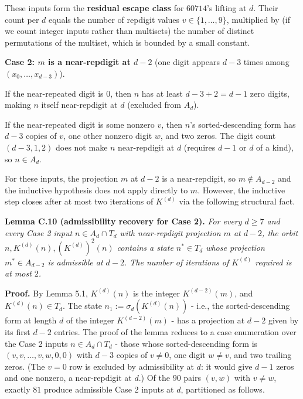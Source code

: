 \documentclass[11pt,letterpaper]{article}
\theoremstyle{paperstyle}
\theoremstyle{paperstyledef}
\theoremstyle{paperstylerem}
\begin{document}
These inputs form the \textbf{residual escape class} for \(60714\)'s
lifting at \(d\). Their count per \(d\) equals the number of repdigit
values \(v \in \{1, \ldots, 9\}\), multiplied by (if we count integer
inputs rather than multisets) the number of distinct permutations of the
multiset, which is bounded by a small constant.

\textbf{Case 2: \(m\) is a near-repdigit at \(d - 2\)} (one digit
appears \(d - 3\) times among \((x_0, \ldots, x_{d-3})\)).

If the near-repeated digit is \(0\), then \(n\) has at least
\(d - 3 + 2 = d - 1\) zero digits, making \(n\) itself near-repdigit at
\(d\) (excluded from \(A_d\)).

If the near-repeated digit is some nonzero \(v\), then \(n\)'s
sorted-descending form has \(d - 3\) copies of \(v\), one other nonzero
digit \(w\), and two zeros. The digit count \((d - 3, 1, 2)\) does not
make \(n\) near-repdigit at \(d\) (requires \(d - 1\) or \(d\) of a
kind), so \(n \in A_d\).

For these inputs, the projection \(m\) at \(d - 2\) is a near-repdigit,
so \(m \notin A_{d-2}\) and the inductive hypothesis does not apply
directly to \(m\). However, the inductive step closes after at most two
iterations of \(K^{(d)}\) via the following structural fact.

\textbf{Lemma C.10 (admissibility recovery for Case 2).} \emph{For every
\(d \geq 7\) and every Case 2 input \(n \in A_d \cap T_d\) with
near-repdigit projection \(m\) at \(d - 2\), the orbit
\(n, K^{(d)}(n), (K^{(d)})^2(n)\) contains a state \(n^* \in T_d\) whose
projection \(m^* \in A_{d-2}\) is admissible at \(d - 2\). The number of
iterations of \(K^{(d)}\) required is at most \(2\).}

\textbf{Proof.} By Lemma 5.1, \(K^{(d)}(n)\) is the integer
\(K^{(d-2)}(m)\), and \(K^{(d)}(n) \in T_d\). The state
\(n_1 := \sigma_d(K^{(d)}(n))\) - i.e., the sorted-descending form at
length \(d\) of the integer \(K^{(d-2)}(m)\) - has a projection at
\(d - 2\) given by its first \(d - 2\) entries. The proof of the lemma
reduces to a case enumeration over the Case 2 inputs
\(n \in A_d \cap T_d\) - those whose sorted-descending form is
\((v, v, \ldots, v, w, 0, 0)\) with \(d - 3\) copies of \(v \neq 0\),
one digit \(w \neq v\), and two trailing zeros. (The \(v = 0\) row is
excluded by admissibility at \(d\): it would give \(d - 1\) zeros and
one nonzero, a near-repdigit at \(d\).) Of the \(90\) pairs \((v, w)\)
with \(v \neq w\), exactly \(81\) produce admissible Case 2 inputs at
\(d\), partitioned as follows.
\end{document}
